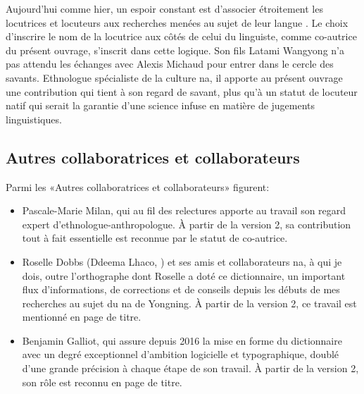 
Aujourd'hui comme hier, un espoir constant est d'associer étroitement les locutrices et locuteurs aux recherches menées au sujet de leur langue \parencite{bouquiauxetal1971}. Le choix d'inscrire le nom de la locutrice aux côtés de celui du linguiste, comme co-autrice du présent ouvrage, s'inscrit dans cette logique. Son fils Latami Wangyong n'a pas attendu les échanges avec Alexis Michaud pour entrer dans le cercle des savants. Ethnologue spécialiste de la culture na, il apporte au présent ouvrage une contribution qui tient à son regard de savant, plus qu'à un statut de locuteur natif qui serait la garantie d'une science infuse en matière de jugements linguistiques.

\subsection{Autres collaboratrices et collaborateurs}

Parmi les «Autres collaboratrices et collaborateurs» figurent:

\begin{itemize}
    \item Pascale-Marie Milan, qui au fil des relectures apporte au travail son regard expert d'ethnologue-anthropologue. À partir de la version 2, sa contribution tout à fait essentielle est reconnue par le statut de co-autrice.
    \item Roselle Dobbs (Ddeema Lhaco, ) et ses amis et collaborateurs na, à qui je dois, outre l'orthographe dont Roselle a doté ce dictionnaire, un important flux d’informations, de corrections et de conseils depuis les débuts de mes recherches au sujet du na de Yongning. À partir de la version 2, ce travail est mentionné en page de titre.
    \item Benjamin Galliot, qui assure depuis 2016 la mise en forme du dictionnaire avec un degré exceptionnel d'ambition logicielle et typographique, doublé d'une grande précision à chaque étape de son travail. À partir de la version 2, son rôle est reconnu en page de titre.
\end{itemize}

